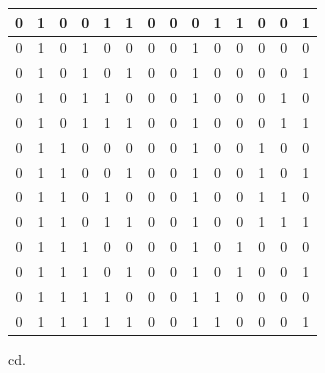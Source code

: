 \documentclass[a4paper]{article}
\begin{document}
\begin{center}
\begin{tabular}{|c|c|c|c|c|c||c|c|c|c|c|c|c|c|}
  \hline 0 & 1 & 0 & 0 & 1 & 1 & 0   &  	0 &	0 &	1 &	1 &	0	& 0	& 1 \\
  \hline 0 & 1 & 0 & 1 & 0 & 0 & 0   &  	0 &	1 &	0 &	0 &	0	& 0	& 0 \\
  \hline 0 & 1 & 0 & 1 & 0 & 1 & 0   &  	0 &	1 &	0 &	0 &	0	& 0	& 1 \\
  \hline 0 & 1 & 0 & 1 & 1 & 0 & 0   &  	0 &	1 &	0 &	0 &	0	& 1	& 0 \\
  \hline 0 & 1 & 0 & 1 & 1 & 1 & 0   &  	0 &	1 &	0 &	0 &	0	& 1	& 1 \\
  \hline 0 & 1 & 1 & 0 & 0 & 0 & 0   &  	0 &	1 &	0 &	0 &	1	& 0	& 0 \\
  \hline 0 & 1 & 1 & 0 & 0 & 1 & 0   &  	0 &	1 &	0 &	0 &	1	& 0	& 1 \\
  \hline 0 & 1 & 1 & 0 & 1 & 0 & 0   &  	0 &	1 &	0 &	0 &	1	& 1	& 0 \\
  \hline 0 & 1 & 1 & 0 & 1 & 1 & 0   &  	0 &	1 &	0 &	0 &	1	& 1	& 1 \\
  \hline 0 & 1 & 1 & 1 & 0 & 0 & 0   &  	0 &	1 &	0 &	1 &	0	& 0	& 0 \\
  \hline 0 & 1 & 1 & 1 & 0 & 1 & 0   &  	0 &	1 &	0 &	1 &	0	& 0	& 1 \\
  \hline 0 & 1 & 1 & 1 & 1 & 0 & 0   &  	0 &	1 &	1 &	0 &	0	& 0	& 0 \\
  \hline 0 & 1 & 1 & 1 & 1 & 1 & 0   &  	0 &	1 &	1 &	0 &	0	& 0	& 1 \\
  \hline
  \end{tabular}
\end{center} 
\pagebreak
cd.
\end{document}
